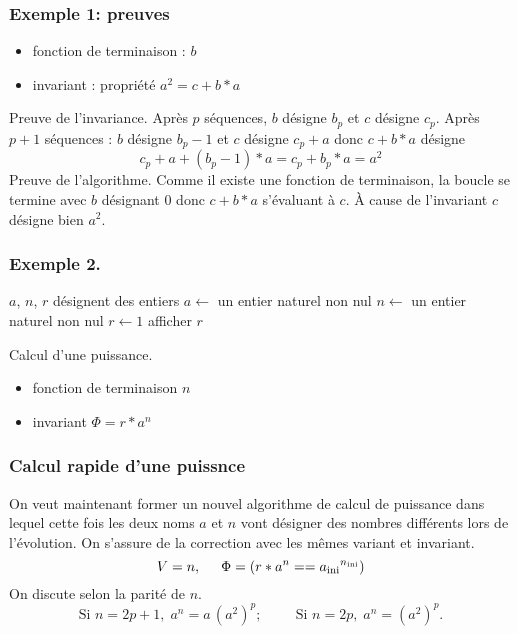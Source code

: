 \begin{frame}
  \frametitle{Exemple 1: preuves}
\begin{itemize}
  \item fonction de terminaison : $b$
  \item invariant : propriété $a^2 = c +b*a$
\end{itemize}
Preuve de l'invariance.\newline
Après $p$ séquences, $b$ désigne $b_p$ et $c$ désigne $c_p$.\newline
Après $p+1$ séquences : $b$ désigne $b_p-1$ et $c$ désigne $c_p+a$ donc $c+b*a$ désigne
  \begin{displaymath}
   c_p + a + (b_p-1)*a = c_p + b_p*a = a^2 
  \end{displaymath}
Preuve de l'algorithme.\newline
Comme il existe une fonction de terminaison, la boucle se termine avec $b$ désignant $0$ donc $c+b*a$ s'évaluant à $c$.
\`A cause de l'invariant $c$ désigne bien $a^2$.
\end{frame}

\begin{frame}
  \frametitle{Exemple 2.}
\begin{algorithm}[H]
  $a$, $n$, $r$ désignent des entiers\;
  $a\longleftarrow$ un entier naturel non nul\;
  $n\longleftarrow$ un entier naturel non nul\;
  $r\longleftarrow 1$\;
  afficher $r$\;
  \caption{Calcul d'une puissance.}
\end{algorithm}
\begin{itemize}
  \item fonction de terminaison $n$
  \item invariant $\Phi = r * a^n$
\end{itemize}
\end{frame}

\begin{frame}
 \frametitle{Calcul rapide d'une puissnce}
On veut maintenant former un nouvel algorithme de calcul de puissance dans lequel cette fois les deux noms $a$ et $n$ vont désigner des nombres différents lors de l'évolution.\newline
On s'assure de la correction avec les mêmes variant et invariant.
\[
 V = n, \hspace{0.5cm} \Phi = \left( r * a^n == {a_{\text{ini}}}^{n_{\text{ini}}}\right)
\]
On discute selon la parité de $n$.
\[
 \text{Si } n = 2p + 1,\; a^n = a \,(a^2)^p ; \hspace{1cm} \text{Si } n = 2p,\; a^n = (a^2)^p.
\] 
\end{frame}

